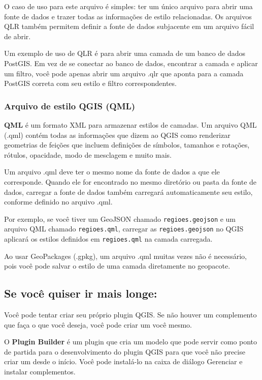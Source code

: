 \documentclass[
]{book}
\begin{document}
O caso de uso para este arquivo é simples: ter um único arquivo para abrir uma fonte de dados e trazer todas as informações de estilo relacionadas. Os arquivos QLR também permitem definir a fonte de dados subjacente em um arquivo fácil de abrir.

Um exemplo de uso de QLR é para abrir uma camada de um banco de dados PostGIS. Em vez de se conectar ao banco de dados, encontrar a camada e aplicar um filtro, você pode apenas abrir um arquivo .qlr que aponta para a camada PostGIS correta com seu estilo e filtro correspondentes.

\hypertarget{arquivo-de-estilo-qgis-qml}{%
\subsubsection{\texorpdfstring{\textbf{Arquivo de estilo QGIS (QML)}}{Arquivo de estilo QGIS (QML)}}\label{arquivo-de-estilo-qgis-qml}}

\textbf{QML} é um formato XML para armazenar estilos de camadas. Um arquivo QML (.qml) contém todas as informações que dizem ao QGIS como renderizar geometrias de feições que incluem definições de símbolos, tamanhos e rotações, rótulos, opacidade, modo de mesclagem e muito mais.

Um arquivo .qml deve ter o mesmo nome da fonte de dados a que ele corresponde. Quando ele for encontrado no mesmo diretório ou pasta da fonte de dados, carregar a fonte de dados também carregará automaticamente seu estilo, conforme definido no arquivo .qml.

Por exemplo, se você tiver um GeoJSON chamado \texttt{regioes.geojson} e um arquivo QML chamado \texttt{regioes.qml}, carregar as \texttt{regioes.geojson} no QGIS aplicará os estilos definidos em \texttt{regioes.qml} na camada carregada.

Ao usar GeoPackages (.gpkg), um arquivo .qml muitas vezes não é necessário, pois você pode salvar o estilo de uma camada diretamente no geopacote.

\hypertarget{se-vocuxea-quiser-ir-mais-longe-1}{%
\subsection{Se você quiser ir mais longe:}\label{se-vocuxea-quiser-ir-mais-longe-1}}

Você pode tentar criar seu próprio plugin QGIS. Se não houver um complemento que faça o que você deseja, você pode criar um você mesmo.

O \textbf{Plugin Builder} é um plugin que cria um modelo que pode servir como ponto de partida para o desenvolvimento do plugin QGIS para que você não precise criar um desde o início. Você pode instalá-lo na caixa de diálogo Gerenciar e instalar complementos.
\end{document}
